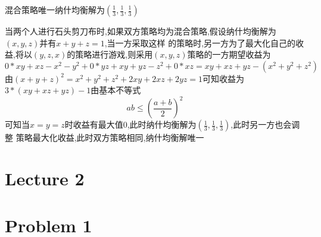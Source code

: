 \documentclass{article}
\begin{document}
混合策略唯一纳什均衡解为$(\frac{1}{3},\frac{1}{3},\frac{1}{3})$

当两个人进行石头剪刀布时,如果双方策略均为混合策略,假设纳什均衡解为$(x,y,z)$并有$x+y+z=1$,当一方采取这样
的策略时,另一方为了最大化自己的收益,将以$(y,z,x)$的策略进行游戏,则采用$(x,y,z)$策略的一方期望收益为
\[0*xy+xz-x^2-y^2+0*yz+xy+yz-z^2+0*xz=xy+xz+yz-(x^2+y^2+z^2)\]
由$(x+y+z)^2=x^2+y^2+z^2+2xy+2xz+2yz=1$可知收益为$3*(xy+xz+yz)-1$由基本不等式\[ab\leq(\frac{a+b}{2})^2\]
可知当$x=y=z$时收益有最大值0,此时纳什均衡解为$(\frac{1}{3},\frac{1}{3},\frac{1}{3})$,此时另一方也会调整
策略最大化收益,此时双方策略相同,纳什均衡解唯一

\section*{Lecture 2}

\section*{Problem 1}
\end{document}
